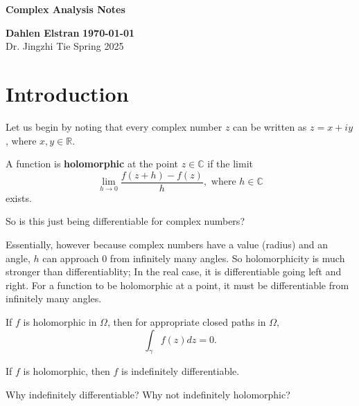 \documentclass[12pt]{article}
\begin{document}
\begin{newtitle}
  \begin{center}
    \textbf{\Huge Complex Analysis Notes}
  \end{center}
  \textbf{Dahlen Elstran} \hfill \textbf{\today} \\
  Dr. Jingzhi Tie \hfill Spring 2025
\end{newtitle}

\section*{Introduction}

Let us begin by noting that every complex number $z$ can be written as $z=x+iy$, where $x,y \in \mathbb{R}$.

\begin{definition}
  A function is \textbf{holomorphic} at the point $z \in \mathbb{C}$ if the limit 
  \begin{equation*}
    \lim_{h \to 0} \frac{f(z+h)-f(z)}{h}, \text{ where } h \in \mathbb{C}
  \end{equation*}
  exists.
\end{definition}

\begin{aq}
  So is this just being differentiable for complex numbers?
\end{aq}
\begin{answer}
  Essentially, however because complex numbers have a value (radius) and an angle, $h$ can approach 0 from 
  infinitely many angles. So holomorphicity is much stronger than differentiablity; In the real case, it 
  is differentiable going left and right. For a function to be holomorphic at a point, it must be differentiable 
  from infinitely many angles.
\end{answer}

\begin{fact}
  If $f$ is holomorphic in $\Omega$, then for appropriate closed paths in $\Omega$, 
  \begin{equation*}
    \int_{\gamma} f(z)dz=0.
  \end{equation*}
\end{fact}

\begin{fact}
  If $f$ is holomorphic, then $f$ is indefinitely differentiable.
\end{fact}

\begin{uq}
  Why indefinitely differentiable? Why not indefinitely holomorphic?
\end{uq}
\end{document}
